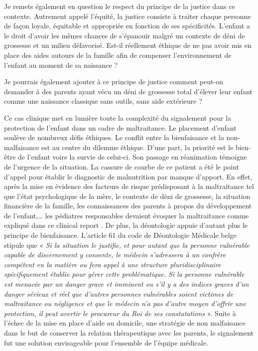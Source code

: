 Je remets également en question le respect du principe de la justice dans ce contexte. Autrement appelé l’équité, la justice consiste à traiter chaque personne de façon loyale, équitable et appropriée en fonction de ses spécificités. L’enfant a le droit d’avoir les mêmes chances de s’épanouir malgré un contexte de déni de grossesse et un milieu défavorisé. Est-il réellement éthique de ne pas avoir mis en place des aides autours de la famille afin de compenser l’environnement de l’enfant au moment de sa naissance ?

Je pourrais également ajouter à ce principe de justice comment peut-on demander à des parents ayant vécu un déni de grossesse total d’élever leur enfant comme une naissance classique sans outils, sans aide extérieure ?

Ce cas clinique met en lumière toute la complexité du signalement pour la protection de l’enfant dans un cadre de maltraitance. Le placement d’enfant soulève de nombreux défis éthiques. Le conflit entre la bienfaisance et la non-malfaisance est au centre du dilemme éthique. D’une part, la priorité est le bien-être de l’enfant voire la survie de celui-ci. Son passage en réanimation témoigne de l’urgence de la situation. La cassure de courbe de ce patient a été le point d’appel pour établir le diagnostic de malnutrition par manque d’apport. En effet, après la mise en évidence des facteurs de risque prédisposant à la maltraitance tel que l’état psychologique de la mère, le contexte de déni de grossesse, la situation financière de la famille, les connaissances des parents à propos du développement de l’enfant,…  les pédiatres responsables devaient évoquer la maltraitance comme expliqué dans ce clinical report \textcite{block2005failure}. De plus, la déontologie appuie d’autant plus le principe de bienfaisance. L’article 61 du code de Déontologie Médicale belge stipule que « \textit{Si la situation le justifie, et pour autant que la personne vulnérable capable de discernement y consente, le médecin s'adressera à un confrère compétent en la matière ou fera appel à une structure pluridisciplinaire spécifiquement établie pour gérer cette problématique. Si la personne vulnérable est menacée par un danger grave et imminent ou s'il y a des indices graves d'un danger sérieux et réel que d'autres personnes vulnérables soient victimes de maltraitance ou négligence et que le médecin n'a pas d'autre moyen d'offrir une protection, il peut avertir le procureur du Roi de ses constatations }». Suite à l’échec de la mise en place d’aide au domicile, une stratégie de non malfaisance dans le but de conserver la relation thérapeutique avec les parents, le signalement fut une solution envisageable pour l’ensemble de l’équipe médicale.

